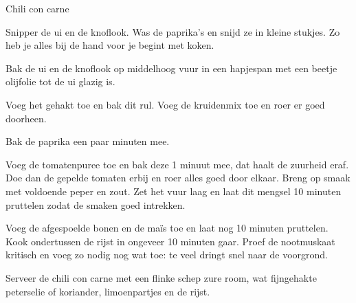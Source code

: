 \begin{recipe}{Chili con carne}
\begin{steps}
  \item Snipper de ui en de knoflook. Was de paprika's en snijd ze in kleine stukjes.
        Zo heb je alles bij de hand voor je begint met koken.
  \item Bak de ui en de knoflook op middelhoog vuur in een hapjespan met een
        beetje olijfolie tot de ui glazig is.
  \item Voeg het gehakt toe en bak dit rul. Voeg de kruidenmix toe en roer
        er goed doorheen.
  \item Bak de paprika een paar minuten mee.
  \item Voeg de tomatenpuree toe en bak deze 1 minuut mee, dat haalt de
        zuurheid eraf. Doe dan de gepelde tomaten erbij en roer alles goed
        door elkaar. Breng op smaak met voldoende peper en zout. Zet het vuur
        laag en laat dit mengsel 10 minuten pruttelen zodat de smaken goed
        intrekken.
  \item Voeg de afgespoelde bonen en de maïs toe en laat nog 10 minuten
        pruttelen. Kook ondertussen de rijst in ongeveer 10 minuten gaar. Proef
        de nootmuskaat kritisch en voeg zo nodig nog wat toe: te veel dringt
        snel naar de voorgrond.
  \item Serveer de chili con carne met een flinke schep zure room, wat
        fijngehakte peterselie of koriander, limoenpartjes en de rijst.
\end{steps}

\end{recipe}
